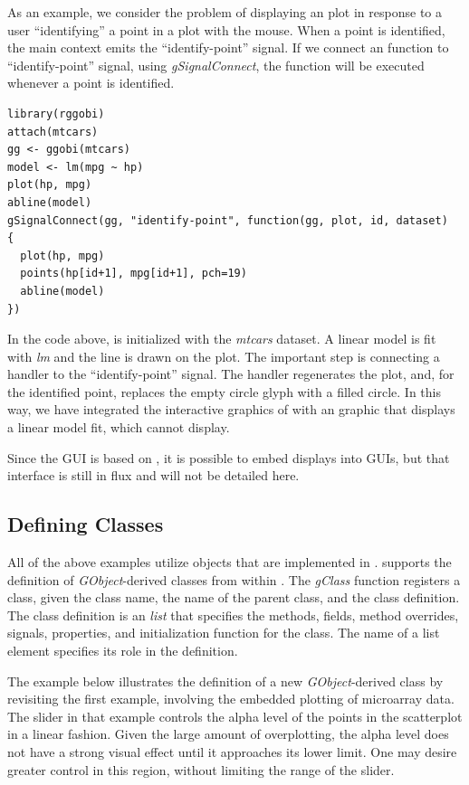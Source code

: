 \documentclass[article]{jss}
\begin{document}
As an example, we consider the problem of displaying an  plot in
response to a user ``identifying'' a point in a  plot with the mouse.
When a  point is identified, the main  context emits
the ``identify-point'' signal. If we connect an  function to
``identify-point'' signal, using \emph{gSignalConnect}, the function will be
executed whenever a point is identified. 
\begin{verbatim}
library(rggobi)
attach(mtcars)
gg <- ggobi(mtcars)
model <- lm(mpg ~ hp)
plot(hp, mpg)
abline(model)
gSignalConnect(gg, "identify-point", function(gg, plot, id, dataset)
{
  plot(hp, mpg)
  points(hp[id+1], mpg[id+1], pch=19)
  abline(model)
})
\end{verbatim}
In the code above,  is initialized with the \emph{mtcars} dataset. 
A linear model is fit with \emph{lm} and the line is drawn on the plot. The 
important step is connecting a handler to the ``identify-point'' signal. The
handler regenerates the  plot, and, for the identified point, 
replaces the empty circle glyph with a filled circle.
In this way, we have integrated the interactive graphics of  with an
 graphic that displays a linear model fit, which  cannot
display.

Since the  GUI is based on , it is possible to embed 
 displays into  GUIs, but that interface is still in flux
and will not be detailed here.

\subsection[Defining GObject Classes]{Defining  Classes}

All of the above examples utilize objects that are implemented in .
 supports the definition of \emph{GObject}-derived classes from within
.  The \emph{gClass} function registers a 
class, given the class name, the name of the parent class, and the class 
definition. The class definition is an  \emph{list} that specifies the
methods, fields, method overrides, signals, properties, and
initialization function for the class. The name of a list element specifies
its role in the definition. 

The example below illustrates the definition of a new \emph{GObject}-derived
class by revisiting the first example, involving the embedded plotting of 
microarray data. The slider in that example controls the alpha level of the
points in the scatterplot in a linear fashion. Given the large amount of
overplotting, the alpha level does not have a strong visual effect until it
approaches its lower limit. One may desire greater control in this region,
without limiting the range of the slider. 
\end{document}

